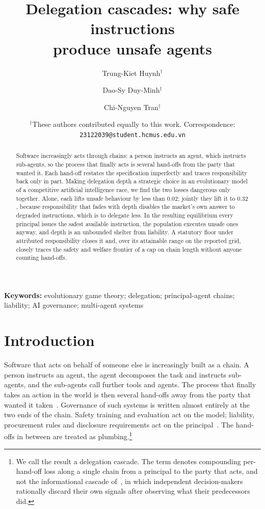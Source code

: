 \documentclass[11pt,a4paper]{article}
\title{\bfseries Delegation cascades: why safe instructions\\ produce unsafe agents}
\author[1,2]{Trung-Kiet Huynh$^{\dagger}$}
\author[1,2]{Dao-Sy Duy-Minh$^{\dagger}$}
\author[1,2]{Chi-Nguyen Tran$^{\dagger}$}
\affil[1]{Faculty of Information Technology, University of Science (HCMUS), Ho Chi Minh City, Vietnam}\affil[2]{Vietnam National University -- Ho Chi Minh City (VNU-HCM), Ho Chi Minh City, Vietnam}
\date{\normalsize $^{\dagger}$These authors contributed equally to this work. Correspondence: \texttt{23122039@student.hcmus.edu.vn}}
\theoremstyle{definition}
\begin{document}
\maketitle

\begin{abstract}
\noindent
Software increasingly acts through chains: a person instructs an agent, which
instructs sub-agents, so the process that finally acts is several hand-offs from
the party that wanted it. Each hand-off restates the specification imperfectly
and traces responsibility back only in part. Making delegation depth a strategic
choice in an evolutionary model of a competitive artificial intelligence race,
we find the two losses dangerous only together. Alone, each lifts unsafe
behaviour by less than $0.02$; jointly they lift it to $0.32$, because
responsibility that fades with depth disables the market's own answer to
degraded instructions, which is to delegate less. In the resulting equilibrium
every principal issues the safest available instruction, the population executes
unsafe ones anyway, and depth is an unbounded shelter from liability. A
statutory floor under attributed responsibility closes it and, over its
attainable range on the reported grid, closely traces the safety and welfare
frontier of a cap on chain length without anyone counting hand-offs.
\end{abstract}

\noindent\textbf{Keywords:} evolutionary game theory; delegation; principal-agent
chains; liability; AI governance; multi-agent systems

\section{Introduction}
\label{sec:intro}

Software that acts on behalf of someone else is increasingly built as a chain.
A person instructs an agent, the agent decomposes the task and instructs
sub-agents, and the sub-agents call further tools and agents. The process that
finally takes an action in the world is then several hand-offs away from the
party that wanted it taken~\citep{wu2023autogen,fourney2024magentic}.
Governance of such systems is written almost entirely at the two ends of the
chain. Safety training and evaluation act on the model; liability, procurement
rules and disclosure requirements act on the
principal~\citep{shavit2023practices,chan2024visibility}. The hand-offs in
between are treated as plumbing.\footnote{We call the result a delegation
cascade. The term denotes compounding per-hand-off loss along a single chain
from a principal to the party that acts, and not the informational cascade
of~\citet{bikhchandani1992theory}, in which independent decision-makers
rationally discard their own signals after observing what their predecessors
did.}
\end{document}
